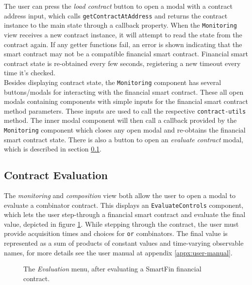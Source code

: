 The user can press the \textit{load contract} button to open a modal with a contract address input, which calls \texttt{getContractAtAddress} and returns the contract instance to the main state through a callback property. When the \texttt{Monitoring} view receives a new contract instance, it will attempt to read the state from the contract again. If any getter functions fail, an error is shown indicating that the smart contract may not be a compatible financial smart contract. Financial smart contract state is re-obtained every few seconds, registering a new timeout every time it's checked. \\

Besides displaying contract state, the \texttt{Monitoring} component has several buttons/modals for interacting with the financial smart contract. These all open modals containing components with simple inputs for the financial smart contract method parameters. These inputs are used to call the respective \texttt{contract-utils} method. The inner modal component will then call a callback provided by the \texttt{Monitoring} component which closes any open modal and re-obtains the financial smart contract state. There is also a button to open an \textit{evaluate contract} modal, which is described in section \ref{client-evaluate}. \\


\subsection{Contract Evaluation} \label{client-evaluate}

The \textit{monitoring} and \textit{composition} view both allow the user to open a modal to evaluate a combinator contract. This displays an \texttt{EvaluateControls} component, which lets the user step-through a financial smart contract and evaluate the final value, depicted in figure \ref{fig:eval-scale-obs-evaluated}. While stepping through the contract, the user must provide acquisition times and choices for \texttt{or} combinators. The final value is represented as a sum of products of constant values and time-varying observable names, for more details see the user manual at appendix \ref{appx:user-manual}. \\

\begin{figure}[h]
    \centering
    \caption{The \textit{Evaluation} menu, after evaluating a SmartFin financial contract.}
    \label{fig:eval-scale-obs-evaluated}
\end{figure}


